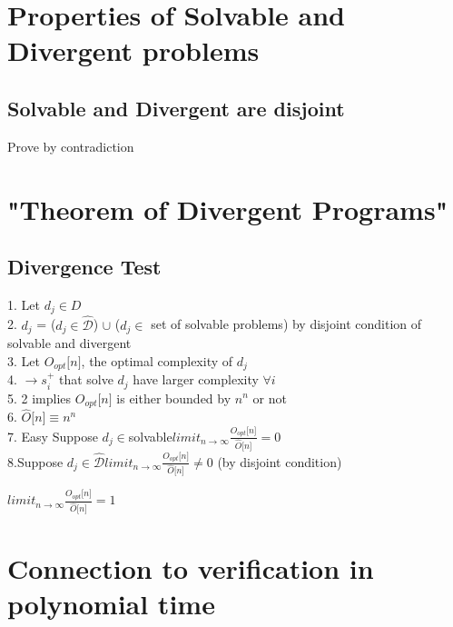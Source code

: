 \documentclass[11pt]{article}
\begin{document}
\section{Properties of Solvable and Divergent problems}

\subsection{Solvable and Divergent are disjoint}
Prove by contradiction



 \section{"Theorem of Divergent Programs"}
\subsection{Divergence Test}
1. Let $d_j \in D$\\
2. $d_j$ = ($d_j \in \hat{\mathcal{D}}$) $\cup$ ($d_j \in$ set of solvable problems) by disjoint condition of solvable and divergent\\
3. Let $O_{opt}\lbrack n \rbrack$, the optimal complexity of $d_j$\\
4. $\rightarrow s_i^{+}$ that solve $d_j$ have larger complexity $\forall i$\\
5. 2 implies  $O_{opt}\lbrack n \rbrack$ is either bounded by $n^n$ or not\\
6. $\hat{O} \lbrack n \rbrack \equiv n^n$\\
7. Easy Suppose $d_j\in $solvable$ limit_{n \rightarrow \infty}\frac{O_{opt}\lbrack n \rbrack}{\hat{O}\lbrack n \rbrack} = 0 $\\
8.Suppose $d_j\in \hat{\mathcal{D}} limit_{n \rightarrow \infty}\frac{O_{opt}\lbrack n \rbrack}{\hat{O}\lbrack n \rbrack} \neq 0 $ (by disjoint condition)\\
\begin{center}
$
 limit_{n \rightarrow \infty}\frac{O_{opt}\lbrack n \rbrack}{\hat{O}\lbrack n \rbrack} = 1 
$
\end{center}




\section{Connection to verification in polynomial time}
\end{document}
